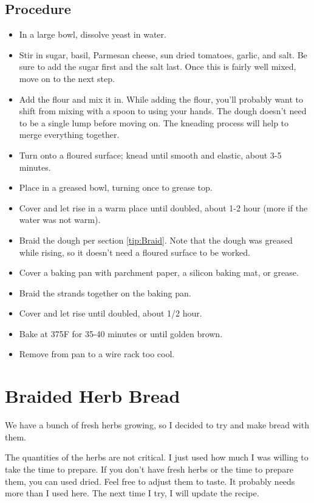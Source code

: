\documentclass[10pt, openany]{book}
\begin{document}
\subsection{Procedure}
\begin{itemize}
  \item In a large bowl, dissolve yeast in water.
  \item Stir in sugar, basil, Parmesan cheese, sun dried tomatoes, garlic, and salt.  Be sure to add the sugar first and the salt last.  Once this is fairly well mixed, move on to the next step.
  \item Add the flour and mix it in.  While adding the flour, you'll probably want to shift from mixing with a spoon to using your hands.  The dough doesn't need to be a single lump before moving on.  The kneading process will help to merge everything together.
  \item Turn onto a floured surface; knead until smooth and elastic, about 3-5 minutes.
  \item Place in a greased bowl, turning once to grease top.
  \item Cover and let rise in a warm place until doubled, about 1-2 hour (more if the water was not warm).
  \item Braid the dough per section \ref{tip:Braid}.  Note that the dough was greased while rising, so it doesn't need a floured surface to be worked.
  \item Cover a baking pan with parchment paper, a silicon baking mat, or grease.
  \item Braid the strands together on the baking pan.
  \item Cover and let rise until doubled, about 1/2 hour.
  \item Bake at 375\degree{}F for 35-40 minutes or until golden brown.
  \item Remove from pan to a wire rack too cool.
\end{itemize}

\section{Braided Herb Bread}
\label{bread:Herb}
We have a bunch of fresh herbs growing, so I decided to try and make bread with them.

The quantities of the herbs are not critical.  I just used how much I was willing to take the time to prepare.  If you don't have fresh herbs or the time to prepare them, you can used dried.  Feel free to adjust them to taste.  It probably needs more than I used here.  The next time I try, I will update the recipe.
\end{document}
